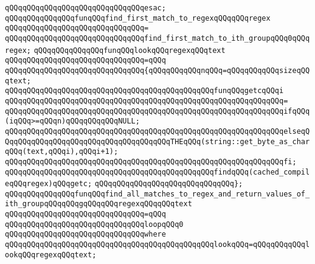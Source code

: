 \verb|qQQqqQQqqQQqqQQqqQQqqQQqqQQqqQQqesac;|\newline
\newline
\newline
\verb|qQQqqQQqqQQqqQQqfunqQQqfind_first_match_to_regexqQQqqQQqregex|\newline
\verb|qQQqqQQqqQQqqQQqqQQqqQQqqQQqqQQq=|\newline
\verb|qQQqqQQqqQQqqQQqqQQqqQQqqQQqqQQqfind_first_match_to_ith_groupqQQq0qQQqregex;|\newline
\newline
\newline
\verb|qQQqqQQqqQQqqQQqfunqQQqlookqQQqregexqQQqtext|\newline
\verb|qQQqqQQqqQQqqQQqqQQqqQQqqQQqqQQq=qQQq|\newline
\verb|qQQqqQQqqQQqqQQqqQQqqQQqqQQqqQQq{qQQqqQQqqQQqnqQQq=qQQqqQQqqQQqsizeqQQqtext;|\newline
\newline
\verb|qQQqqQQqqQQqqQQqqQQqqQQqqQQqqQQqqQQqqQQqqQQqqQQqfunqQQqgetcqQQqi|\newline
\verb|qQQqqQQqqQQqqQQqqQQqqQQqqQQqqQQqqQQqqQQqqQQqqQQqqQQqqQQqqQQqqQQq=|\newline
\verb|qQQqqQQqqQQqqQQqqQQqqQQqqQQqqQQqqQQqqQQqqQQqqQQqqQQqqQQqqQQqqQQqifqQQq(iqQQq>=qQQqn)qQQqqQQqqQQqNULL;|\newline
\verb|qQQqqQQqqQQqqQQqqQQqqQQqqQQqqQQqqQQqqQQqqQQqqQQqqQQqqQQqqQQqqQQqelseqQQqqQQqqQQqqQQqqQQqqQQqqQQqqQQqqQQqqQQqTHEqQQq(string::get_byte_as_charqQQq(text,qQQqi),qQQqi+1);|\newline
\verb|qQQqqQQqqQQqqQQqqQQqqQQqqQQqqQQqqQQqqQQqqQQqqQQqqQQqqQQqqQQqqQQqfi;|\newline
\newline
\verb|qQQqqQQqqQQqqQQqqQQqqQQqqQQqqQQqqQQqqQQqqQQqqQQqfindqQQq(cached_compileqQQqregex)qQQqgetc;|\newline
\verb|qQQqqQQqqQQqqQQqqQQqqQQqqQQqqQQq};|\newline
\newline
\newline
\verb|qQQqqQQqqQQqqQQqfunqQQqfind_all_matches_to_regex_and_return_values_of_ith_groupqQQqqQQqgqQQqqQQqregexqQQqqQQqtext|\newline
\verb|qQQqqQQqqQQqqQQqqQQqqQQqqQQqqQQq=qQQq|\newline
\verb|qQQqqQQqqQQqqQQqqQQqqQQqqQQqqQQqloopqQQq0|\newline
\verb|qQQqqQQqqQQqqQQqqQQqqQQqqQQqqQQqwhere|\newline
\verb|qQQqqQQqqQQqqQQqqQQqqQQqqQQqqQQqqQQqqQQqqQQqqQQqlookqQQq=qQQqqQQqqQQqlookqQQqregexqQQqtext;|\newline
